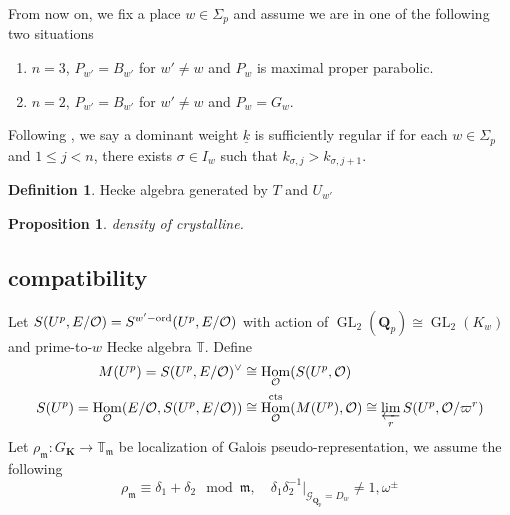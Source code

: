 \documentclass[leqno]{amsart}
\newcommand{\wt}[1]{\underline{ #1 }}
\newcommand{\TT}{\mathbb{T}} %
\newcommand{\Gp}{\mathcal{G}_{\Qp}} %
\newcommand{\cts}{\textnormal{cts}}
\newcommand{\ord}{\textnormal{ord}}
\DeclareMathOperator{\GL}{GL}
\newcommand{\Qp}{\mathbf{Q}_p}
\newcommand{\K}{{\mathbf{K}}} %
\newcommand{\oo}{\mathcal{O}} %
\newcommand{\fm}{\mathfrak{m}}
\DeclareMathOperator{\Hom}{Hom}
\newtheorem{prop}[thm]{Proposition}
\theoremstyle{definition}
\newtheorem{defn}[thm]{Definition}
\theoremstyle{remark}
\begin{document}
From now on,
we fix a place $w\in \Sigma_p$ and
assume we are in one of the following two situations
\begin{enumerate}[label=(\Roman*)]
	\item $n=3$, $P_{w'}=B_{w'}$ for $w'\neq w$ and $P_w$ is
		maximal proper parabolic.
	\item $n=2$, $P_{w'}=B_{w'}$ for $w'\neq w$ and $P_w=G_w$.
\end{enumerate}

Following \cite{ger},
we say a dominant weight $\wt{k}$ is sufficiently regular
if for each $w\in \Sigma_p$ and $1\leq j<n$,
there exists  $\sigma\in I_w$
such that  $k_{\sigma,j}>k_{\sigma,j+1}$.

\begin{defn}
	Hecke algebra 
	generated by $T$ and $  U_{w'}$
\end{defn}

\begin{prop}
	density of crystalline.
\end{prop}


\subsection{compatibility}

Let $S(U^p,E/\oo)=S^{w'-\ord}(U^p,E/\oo)$
with action of $\GL_2(\Qp)\cong \GL_2(K_w)$
and prime-to-$w$ Hecke algebra $\TT$. 
Define
\begin{align*}
	M(U^p)=S(U^p,E/\oo)^{\vee}&\cong 
	\Hom_{\oo}(S(U^p,\oo)\\
	S(U^p)=\Hom_{\oo}(E/\oo,S(U^p,E/\oo))&\cong
	\Hom_{\oo}^{\cts}(M(U^p),\oo)\cong 
	\varprojlim_{r}S(U^p,\oo/\varpi^r)
\end{align*}
Let $\rho_\fm\colon G_\K\to \TT_\fm$
be localization of Galois pseudo-representation,
we assume the following 
\begin{equation}\tag{assump}\label{cond:gen}
	\rho_\fm\equiv \delta_1+\delta_2\mod \fm,\quad
	\delta_1\delta_2^{-1}\vert_{\Gp=D_w}
	\neq 1,\omega^{\pm}
\end{equation}
\end{document}
